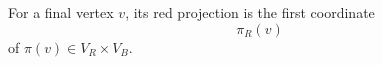 \begin{definition}
For a final vertex \(v\), its red projection is the first coordinate
\[
\pi_R(v)
\]
of \(\pi(v)\in V_R\times V_B\).
\end{definition}
